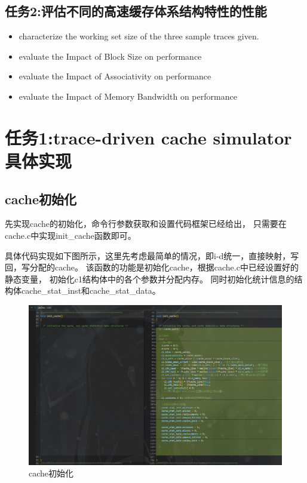 \documentclass[12pt,hyperref,a4paper,UTF8]{ctexart}
\begin{document}
\newpage

\subsection*{任务2:评估不同的高速缓存体系结构特性的性能}

\begin{itemize}
    \item characterize the working set size of the three
sample traces given.
    \item evaluate the Impact of Block Size on performance
    \item evaluate the Impact of Associativity on performance
    \item evaluate the Impact of Memory Bandwidth on performance
\end{itemize}





\newpage


\section{任务1:trace-driven cache simulator具体实现}


\subsection{cache初始化}

先实现cache的初始化，命令行参数获取和设置代码框架已经给出，
只需要在cache.c中实现init\_cache函数即可。

具体代码实现如下图所示，这里先考虑最简单的情况，即i-d统一，直接映射，写回，写分配的cache。
该函数的功能是初始化cache，根据cache.c中已经设置好的静态变量，
初始化c1结构体中的各个参数并分配内存。
同时初始化统计信息的结构体cache\_stat\_inst和cache\_stat\_data。
\begin{figure}[H]
    \centering
    \includegraphics[width=1\textwidth]{./figures/fig/image1.png}
    \caption{cache初始化}
\end{figure}
\end{document}
